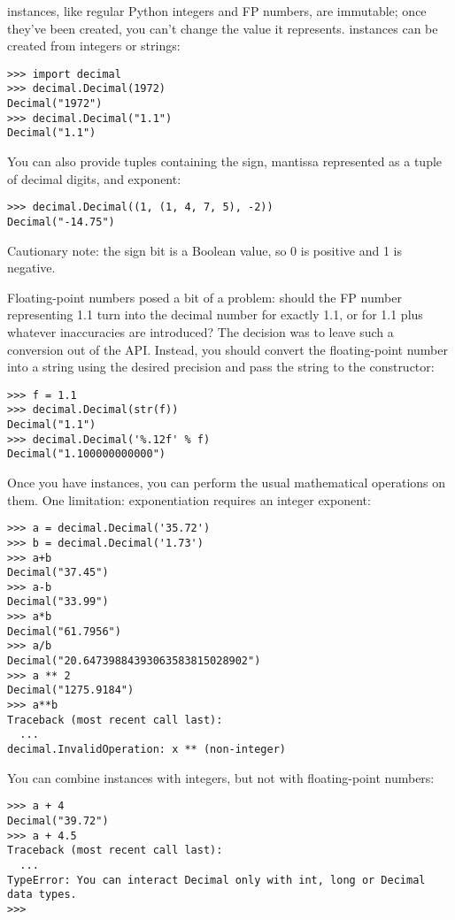 \documentclass{howto}
\begin{document}
 instances, like regular Python integers and FP numbers, are immutable; once they've been created, you can't change the value it represents.  
 instances can be created from integers or strings:

\begin{verbatim}
>>> import decimal
>>> decimal.Decimal(1972)
Decimal("1972")
>>> decimal.Decimal("1.1")
Decimal("1.1")
\end{verbatim}

You can also provide tuples containing the sign, mantissa represented 
as a tuple of decimal digits, and exponent:

\begin{verbatim}
>>> decimal.Decimal((1, (1, 4, 7, 5), -2))
Decimal("-14.75")
\end{verbatim}

Cautionary note: the sign bit is a Boolean value, so 0 is positive and 1 is negative.

Floating-point numbers posed a bit of a problem: should the FP number
representing 1.1 turn into the decimal number for exactly 1.1, or for
1.1 plus whatever inaccuracies are introduced?  The decision was to
leave such a conversion out of the API.  Instead, you should convert
the floating-point number into a string using the desired precision and 
pass the string to the  constructor:

\begin{verbatim}
>>> f = 1.1
>>> decimal.Decimal(str(f))
Decimal("1.1")
>>> decimal.Decimal('%.12f' % f)
Decimal("1.100000000000")
\end{verbatim}

Once you have  instances, you can perform the usual
mathematical operations on them.  One limitation: exponentiation
requires an integer exponent:

\begin{verbatim}
>>> a = decimal.Decimal('35.72')
>>> b = decimal.Decimal('1.73')
>>> a+b
Decimal("37.45")
>>> a-b
Decimal("33.99")
>>> a*b
Decimal("61.7956")
>>> a/b
Decimal("20.64739884393063583815028902")
>>> a ** 2
Decimal("1275.9184")
>>> a**b
Traceback (most recent call last):
  ...
decimal.InvalidOperation: x ** (non-integer)
\end{verbatim}

You can combine  instances with integers, but not with
floating-point numbers:

\begin{verbatim}
>>> a + 4
Decimal("39.72")
>>> a + 4.5
Traceback (most recent call last):
  ...
TypeError: You can interact Decimal only with int, long or Decimal data types.
>>>
\end{verbatim}
\end{document}
